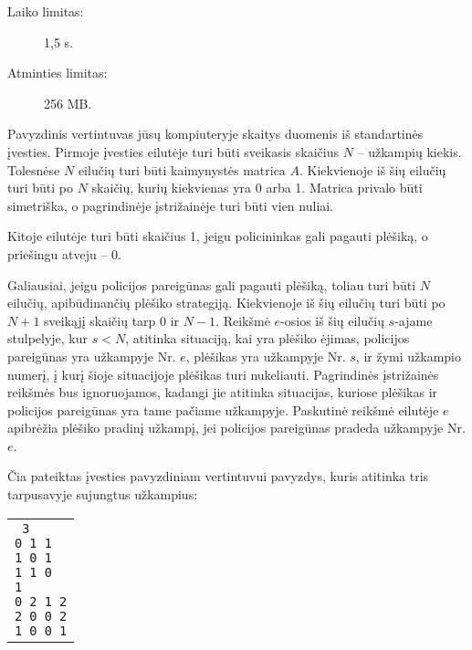 \documentclass{boi2014-lt}
\begin{document}
    \begin{description}
        \item[Laiko limitas:] 1,5 s.
        \item[Atminties limitas:] 256 MB.
    \end{description}

    \Experimentation
	Pavyzdinis vertintuvas jūsų kompiuteryje skaitys duomenis iš standartinės
	įvesties. Pirmoje įvesties eilutėje turi būti sveikasis skaičius $N$ --
	užkampių kiekis. Tolesnėse $N$ eilučių turi būti kaimynystės matrica $A$.
	Kiekvienoje iš šių eilučių turi būti po $N$ skaičių, kurių kiekvienas yra
	0 arba 1. Matrica privalo būti simetriška, o pagrindinėje įstrižainėje
	turi būti vien nuliai.

	Kitoje eilutėje turi būti skaičius 1, jeigu policininkas gali pagauti
	plėšiką, o priešingu atveju -- 0.

	Galiausiai, jeigu policijos pareigūnas gali pagauti plėšiką, toliau turi
	būti $N$ eilučių, apibūdinančių plėšiko strategiją. Kiekvienoje iš šių
	eilučių turi būti po $N + 1$ sveikąjį skaičių tarp 0 ir $N - 1$. Reikšmė
	$e$-osios iš šių eilučių $s$-ajame stulpelyje, kur $s < N$, atitinka
	situaciją, kai yra plėšiko ėjimas, policijos pareigūnas yra užkampyje
	Nr. $e$, plėšikas yra užkampyje Nr. $s$, ir žymi užkampio numerį, į kurį
	šioje situacijoje plėšikas turi nukeliauti. Pagrindinės įstrižainės
	reikšmės bus ignoruojamos, kadangi jie atitinka situacijas, kuriose
	plėšikas ir policijos pareigūnas yra tame pačiame užkampyje. Paskutinė
	reikšmė eilutėje $e$ apibrėžia plėšiko pradinį užkampį, jei policijos
	pareigūnas pradeda užkampyje Nr. $e$.

	Čia pateiktas įvesties pavyzdiniam vertintuvui pavyzdys, kuris atitinka
	tris tarpusavyje sujungtus užkampius:

    \begin{center}
        \begin{tabular}{p{4cm}}
            {\tt
                3 \newline
                0 1 1 \newline
                1 0 1 \newline
                1 1 0 \newline
                1 \newline
                0 2 1 2 \newline
                2 0 0 2 \newline
                1 0 0 1 \newline
            }
        \end{tabular}
    \end{center}
\end{document}
